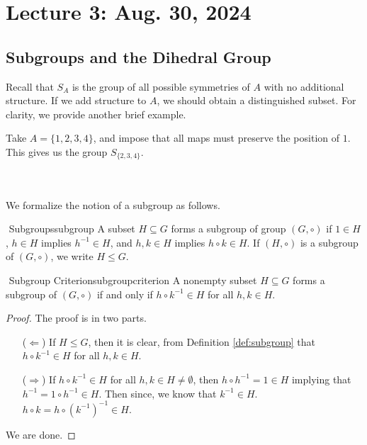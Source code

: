 \pagebreak

\section{Lecture 3: Aug. 30, 2024}

    \subsection{Subgroups and the Dihedral Group}

        Recall that \(S_A\) is the group of all possible symmetries of \(A\) with no additional structure. If we add structure to \(A\), we should obtain a distinguished subset. For clarity, we provide another brief example.
        \begin{example}
            Take \(A=\{1,2,3,4\}\), and impose that all maps must preserve the position of \(1\). This gives us the group \(S_{\{2,3,4\}}\).
        \end{example}
        \vphantom
        \\
        \\
        We formalize the notion of a subgroup as follows.
        \begin{definition}{\Stop\,\,Subgroups}{subgroup}
            A subset \(H\subseteq G\) forms a subgroup of group \((G,\circ)\) if \(1\in H\), \(h\in H\) implies \(h^{-1}\in H\), and \(h,k\in H\) implies \(h\circ k\in H\). If \((H,\circ)\) is a subgroup of \((G,\circ)\), we write \(H\leq G\).
        \end{definition}
        \begin{theorem}{\Stop\,\,Subgroup Criterion}{subgroupcriterion}
            A nonempty subset \(H\subseteq G\) forms a subgroup of \((G,\circ)\) if and only if \(h\circ k^{-1}\in H\) for all \(h,k\in H\).
            \begin{proof}
                The proof is in two parts.
                \begin{enumerate}
                    \item[(\(\Leftarrow\))] If \(H\leq G\), then it is clear, from Definition \ref{def:subgroup} that \(h\circ k^{-1}\in H\) for all \(h,k\in H\).
                    \item[(\(\Rightarrow\))] If \(h\circ k^{-1}\in H\) for all \(h,k\in H\neq\emptyset\), then \(h\circ h^{-1}=1\in H\) implying that \(h^{-1}=1\circ h^{-1}\in H\). Then since, we know that \(k^{-1}\in H\). \(h\circ k=h\circ (k^{-1})^{-1}\in H\).
                \end{enumerate}
                We are done.
            \end{proof}
        \end{theorem}
